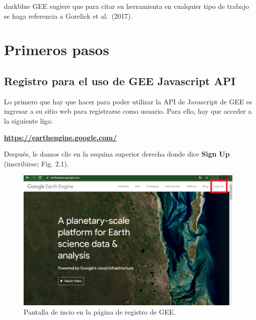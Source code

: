 \documentclass[
  12pt,
  letterpaper,
  twoside]{book}
\begin{document}
\begin{bluebox2}

\begin{awesomeblock}{5pt}{\faLightbulb}{darkblue}
GEE sugiere que para citar su herramienta en cualquier tipo de trabajo se haga referencia a Gorelick et al.~(2017).

\end{awesomeblock}

\end{bluebox2}

\newpage

\hypertarget{primeros-pasos}{%
\chapter{Primeros pasos}\label{primeros-pasos}}

\hypertarget{registro-para-el-uso-de-gee-javascript-api}{%
\section{Registro para el uso de GEE Javascript API}\label{registro-para-el-uso-de-gee-javascript-api}}

Lo primero que hay que hacer para poder utilizar la API de Javascript de GEE es ingresar a su sitio web para registrarse como usuario. Para ello, hay que acceder a la siguiente liga:

\textbf{\url{https://earthengine.google.com/}}

Después, le damos clic en la esquina superior derecha donde dice \textbf{Sign Up} (inscribirse; Fig. 2.1).

\begin{figure}[btp]

{\centering \includegraphics[width=1\linewidth]{Img/Signup} 

}

\caption{Pantalla de incio en la página de registro de GEE.}\label{fig:unnamed-chunk-2}
\end{figure}
\end{document}
